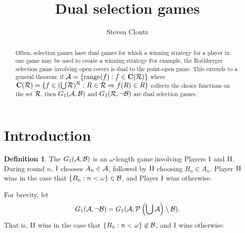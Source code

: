 \documentclass{amsart}
\theoremstyle{plain}
\theoremstyle{definition}
\newtheorem{definition}[theorem]{Definition}
\theoremstyle{remark}
\theoremstyle{plain}
\theoremstyle{definition}
\theoremstyle{remark}
\begin{document}
\title{Dual selection games}



\author{Steven Clontz}
\address{Department of Mathematics and Statistics,
The University of South Alabama,
Mobile, AL 36688}










\begin{abstract}
  Often, selection games have dual games for which a winning
  strategy for a player in one game may be used to create
  a winning strategy 
  For example, the Rothberger selection game involving open covers
  is dual to the point-open game. This extends to a general
  theorem: if \(\mathcal{A}=\{\text{range}(f):f\in\mathbf C(\mathcal{R})\}\)
  where \(\mathbf C(\mathcal{R})=\{f\in(\bigcup\mathcal{R})^{\mathcal{R}}:R\in\mathcal{R}\Rightarrow f(R)\in R\}\) 
  collects the choice functions on the set \(\mathcal{R}\),
  then \(G_1(\mathcal{A},\mathcal{B})\) and \(G_1(\mathcal{R},\neg\mathcal{B})\)
  are dual selection games. 
\end{abstract}


\maketitle







\section{Introduction}

\begin{definition}
  The  \(G_{1}(\mathcal{A},\mathcal{B})\) 
  is an \(\omega\)-length game involving Players \(\mathrm{I}\) and \(\mathrm{II}\). 
  During round \(n\), \(\mathrm{I}\) chooses
  \(A_n\in\mathcal{A}\), followed by \(\mathrm{II}\) choosing \(B_n\in A_n\).
  Player \(\mathrm{II}\) wins in the case that \(\{B_n:n<\omega\}\in\mathcal{B}\),
  and Player \(\mathrm{I}\) wins otherwise.
\end{definition}

  For brevity, let 
  \[
    G_{1}(\mathcal{A},\neg \mathcal{B})
      =
    G_{1}(\mathcal{A},\mathcal{P}\left(\bigcup \mathcal{A}\right)\setminus \mathcal{B})
  .\]
  That is, \(\mathrm{II}\) wins in the case that \(\{B_n:n<\omega\}\not\in\mathcal{B}\),
  and \(\mathrm{I}\) wins otherwise.
\end{document}
